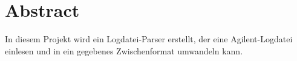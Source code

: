 \section*{Abstract}\label{Abstract}
In diesem Projekt wird ein Logdatei-Parser erstellt, der eine Agilent-Logdatei einlesen und in ein gegebenes Zwischenformat umwandeln kann.